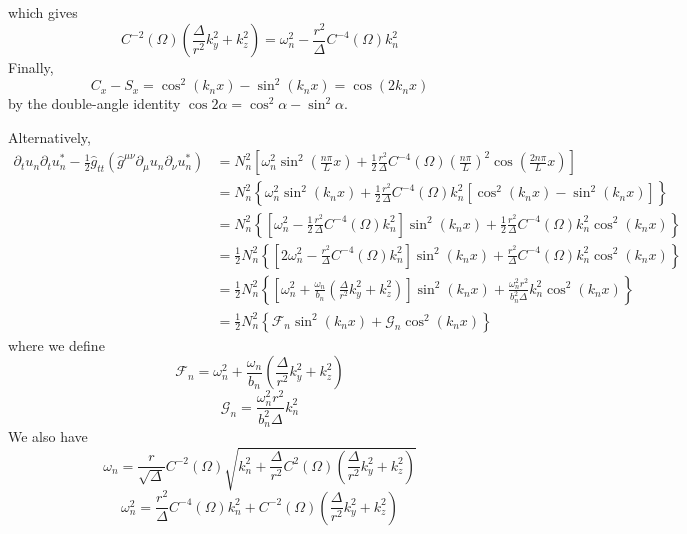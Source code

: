 \documentclass[english]{article}
\begin{document}
 which gives 
\[
C^{-2}\left(\Omega\right)\left(\frac{\Delta}{r^{2}}k^{2}_{y}+k^{2}_{z}\right)=\omega^{2}_{n}-\frac{r^{2}}{\Delta}C^{-4}\left(\Omega\right)k^{2}_{n}
\]
 Finally, 
\[
C_{x}-S_{x}=\cos^{2}\left(k_{n}x\right)-\sin^{2}\left(k_{n}x\right)=\cos\left(2k_{n}x\right)
\]
 by the double-angle identity $\cos2\alpha=\cos^{2}\alpha-\sin^{2}\alpha$.

Alternatively, 
\begin{align*}
\partial_{t}u_{n}\partial_{t}u^{*}_{n}-\frac{1}{2}\hat{g}_{tt}\left(\hat{g}^{\mu\nu}\partial_{\mu}u_{n}\partial_{\nu}u^{*}_{n}\right) & =N^{2}_{n}\left[\omega^{2}_{n}\sin^{2}\left(\frac{n\pi}{L}x\right)+\frac{1}{2}\frac{r^{2}}{\Delta}C^{-4}\left(\Omega\right)\left(\frac{n\pi}{L}\right)^{2}\cos\left(\frac{2n\pi}{L}x\right)\right]\\
 & =N^{2}_{n}\left\{ \omega^{2}_{n}\sin^{2}\left(k_{n}x\right)+\frac{1}{2}\frac{r^{2}}{\Delta}C^{-4}\left(\Omega\right)k^{2}_{n}\left[\cos^{2}\left(k_{n}x\right)-\sin^{2}\left(k_{n}x\right)\right]\right\} \\
 & =N^{2}_{n}\left\{ \left[\omega^{2}_{n}-\frac{1}{2}\frac{r^{2}}{\Delta}C^{-4}\left(\Omega\right)k^{2}_{n}\right]\sin^{2}\left(k_{n}x\right)+\frac{1}{2}\frac{r^{2}}{\Delta}C^{-4}\left(\Omega\right)k^{2}_{n}\cos^{2}\left(k_{n}x\right)\right\} \\
 & =\frac{1}{2}N^{2}_{n}\left\{ \left[2\omega^{2}_{n}-\frac{r^{2}}{\Delta}C^{-4}\left(\Omega\right)k^{2}_{n}\right]\sin^{2}\left(k_{n}x\right)+\frac{r^{2}}{\Delta}C^{-4}\left(\Omega\right)k^{2}_{n}\cos^{2}\left(k_{n}x\right)\right\} \\
 & =\frac{1}{2}N^{2}_{n}\left\{ \left[\omega^{2}_{n}+\frac{\omega_{n}}{b_{n}}\left(\frac{\Delta}{r^{2}}k^{2}_{y}+k^{2}_{z}\right)\right]\sin^{2}\left(k_{n}x\right)+\frac{\omega^{2}_{n}r^{2}}{b^{2}_{n}\Delta}k^{2}_{n}\cos^{2}\left(k_{n}x\right)\right\} \\
 & =\frac{1}{2}N^{2}_{n}\left\{ \mathcal{F}_{n}\sin^{2}\left(k_{n}x\right)+\mathcal{G}_{n}\cos^{2}\left(k_{n}x\right)\right\} 
\end{align*}
 where we define 
\[
\mathcal{F}_{n}=\omega^{2}_{n}+\frac{\omega_{n}}{b_{n}}\left(\frac{\Delta}{r^{2}}k^{2}_{y}+k^{2}_{z}\right)
\]
 {}
\[
\mathcal{G}_{n}=\frac{\omega^{2}_{n}r^{2}}{b^{2}_{n}\Delta}k^{2}_{n}
\]
 We also have 
\[
\omega_{n}=\frac{r}{\sqrt{\Delta}}C^{-2}\left(\Omega\right)\sqrt{k^{2}_{n}+\frac{\Delta}{r^{2}}C^{2}\left(\Omega\right)\left(\frac{\Delta}{r^{2}}k^{2}_{y}+k^{2}_{z}\right)}
\]
 {}
\[
\omega^{2}_{n}=\frac{r^{2}}{\Delta}C^{-4}\left(\Omega\right)k^{2}_{n}+C^{-2}\left(\Omega\right)\left(\frac{\Delta}{r^{2}}k^{2}_{y}+k^{2}_{z}\right)
\]
\end{document}
